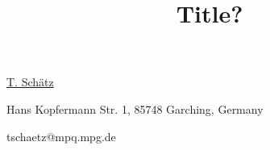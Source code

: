 \title{Title?}

\underline{T. Sch\"{a}tz} 

{\normalsize{\vspace{-4mm}
Hans Kopfermann Str. 1, 85748 Garching, Germany

\email tschaetz@mpq.mpg.de}}



\vspace{\baselineskip}
